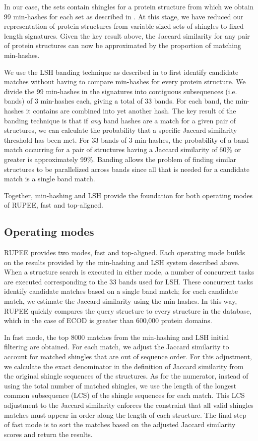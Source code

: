 \documentclass[10pt,letterpaper]{article}
\begin{document}
In our case, the sets contain shingles for a protein structure from which we obtain 99 min-hashes for each set as described in \cite{Rajaraman2012}. 
At this stage, we have reduced our representation of protein structures from variable-sized sets of shingles to fixed-length signatures.
Given the key result above, the Jaccard similarity for any pair of protein structures can now be approximated by the proportion of matching min-hashes. 

We use the LSH banding technique as described in \cite{Rajaraman2012} to first identify candidate matches without having to compare min-hashes for every protein structure. 
We divide the 99 min-hashes in the signatures into contiguous subsequences (i.e. bands) of 3 min-hashes each, giving a total of 33 bands. 
For each band, the min-hashes it contains are combined into yet another hash. 
The key result of the banding technique is that if \emph{any} band hashes are a match for a given pair of structures, we can calculate the probability that a specific Jaccard similarity threshold has been met.
For 33 bands of 3 min-hashes, the probability of a band match occurring for a pair of structures having a Jaccard similarity of 60\% or greater is approximately 99\%. 
Banding allows the problem of finding similar structures to be parallelized across bands since all that is needed for a candidate match is a single band match. 

Together, min-hashing and LSH provide the foundation for both operating modes of RUPEE, fast and top-aligned.

\subsection*{Operating modes}

RUPEE provides two modes, fast and top-aligned. 
Each operating mode builds on the results provided by the min-hashing and LSH system described above. 
When a structure search is executed in either mode, a number of concurrent tasks are executed corresponding to the 33 bands used for LSH. 
These concurrent tasks identify candidate matches based on a single band match; for each candidate match, we estimate the Jaccard similarity using the min-hashes. 
In this way, RUPEE quickly compares the query structure to every structure in the database, which in the case of ECOD is greater than 600,000 protein domains.

In fast mode, the top 8000 matches from the min-hashing and LSH initial filtering are obtained.
For each match, we adjust the Jaccard similarity to account for matched shingles that are out of sequence order. 
For this adjustment, we calculate the exact denominator in the definition of Jaccard similarity from the original shingle sequences of the structures.
As for the numerator, instead of using the total number of matched shingles, we use the length of the longest common subsequence (LCS) of the shingle sequences for each match. 
This LCS adjustment to the Jaccard similarity enforces the constraint that all valid shingles matches must appear in order along the length of each structure. 
The final step of fast mode is to sort the matches based on the adjusted Jaccard similarity scores and return the results. 
\end{document}
